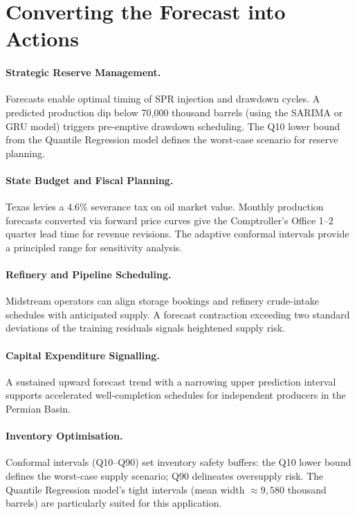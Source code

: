 \documentclass[12pt,a4paper]{article}
\begin{document}
\section{Converting the Forecast into Actions}

\paragraph{Strategic Reserve Management.}
Forecasts enable optimal timing of SPR injection and drawdown cycles. A predicted production dip below 70,000 thousand barrels (using the SARIMA or GRU model) triggers pre-emptive drawdown scheduling. The Q10 lower bound from the Quantile Regression model defines the worst-case scenario for reserve planning.

\paragraph{State Budget and Fiscal Planning.}
Texas levies a 4.6\% severance tax on oil market value. Monthly production forecasts converted via forward price curves give the Comptroller's Office 1--2 quarter lead time for revenue revisions. The adaptive conformal intervals provide a principled range for sensitivity analysis.

\paragraph{Refinery and Pipeline Scheduling.}
Midstream operators can align storage bookings and refinery crude-intake schedules with anticipated supply. A forecast contraction exceeding two standard deviations of the training residuals signals heightened supply risk.

\paragraph{Capital Expenditure Signalling.}
A sustained upward forecast trend with a narrowing upper prediction interval supports accelerated well-completion schedules for independent producers in the Permian Basin.

\paragraph{Inventory Optimisation.}
Conformal intervals (Q10--Q90) set inventory safety buffers: the Q10 lower bound defines the worst-case supply scenario; Q90 delineates oversupply risk. The Quantile Regression model's tight intervals (mean width $\approx 9{,}580$ thousand barrels) are particularly suited for this application.
\end{document}

